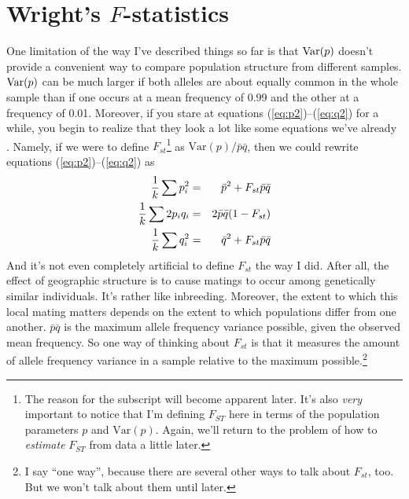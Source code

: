 \section*{Wright's $F$-statistics}

One limitation of the way I've described things so far is that
$\hbox{Var}(p)$ doesn't provide a convenient way to compare population
structure from different samples. $\hbox{Var}(p)$ can be much larger
if both alleles are about equally common in the whole sample than if
one occurs at a mean frequency of 0.99 and the other at a frequency of
0.01. Moreover, if you stare at equations (\ref{eq:p2})--(\ref{eq:q2})
for a while, you begin to realize that they look a lot like some
equations we've already
.
Namely, if we were to define $F_{st}$\footnote{The reason for the
  subscript will become apparent later. It's also {\it very\/}
  important to notice that I'm defining $F_{ST}$ here in terms of the
  population parameters $p$ and $\mbox{Var}(p)$. Again, we'll return
  to the problem of how to {\it estimate\/} $F_{ST}$ from data a
  little later.} as $\mbox{Var}(p)/\bar p\bar q$, then we could
rewrite equations (\ref{eq:p2})--(\ref{eq:q2}) as
\begin{eqnarray}
\frac{1}{k}\sum p_i^2 &=& \bar p^2 + F_{st}\bar p \bar q \label{eq:p2-f} \\
\frac{1}{k}\sum 2p_iq_i &=& 2\bar p\bar q(1 - F_{st}) \label{eq:2pq-f} \\
\frac{1}{k}\sum q_i^2   &=& \bar q^2 + F_{st}\bar p \bar q \label{eq:q2-f}
\end{eqnarray}
And it's not even completely artificial to define $F_{st}$ the way I
did. After all, the effect of geographic structure is to cause matings
to occur among genetically similar individuals. It's rather like
inbreeding. Moreover, the extent to which this local mating matters
depends on the extent to which populations differ from one
another. $\bar p\bar q$ is the maximum allele frequency variance
possible, given the observed mean frequency. So one way of thinking
about $F_{st}$ is that it measures the amount of allele frequency
variance in a sample relative to the maximum possible.\footnote{I say
  ``one way'', because there are several other ways to talk about
  $F_{st}$, too. But we won't talk about them until later.}

